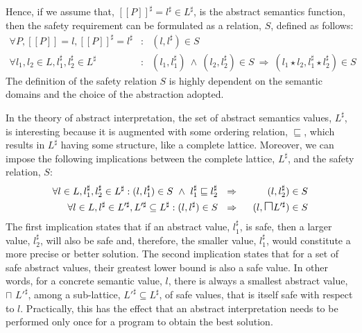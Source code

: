 \documentclass[10pt,a4paper,final,oneside,fleqn]{book}
\begin{document}
Hence, if we assume that, $[\![P]\!]^\sharp=l^\sharp\in L^\sharp$, is the abstract semantics function, then the safety requirement can be formulated as a relation, $S$, defined as follows:
\begin{eqnarray*}
\forall P, [\![P]\!]=l, [\![P]\!]^\sharp=l^\sharp&:&(l,l^\sharp)\in S\\
\forall l_1,l_2\in L,l_1^\sharp,l_2^\sharp\in L^\sharp&:&(l_1,l_1^\sharp)~\wedge~(l_2,l_2^\sharp)\in S~\Rightarrow~(l_1\star l_2, l_1^\sharp\star l_2^\sharp)\in S
\end{eqnarray*}
The definition of the safety relation $S$ is highly dependent on the semantic domains and the choice of the abstraction adopted.

In the theory of abstract interpretation, the set of abstract semantics values, $L^\sharp$, is interesting because it is augmented with some ordering relation, $\sqsubseteq$, which results in $L^\sharp$ having some structure, like a complete lattice. Moreover, we can impose the following implications between the complete lattice, $L^\sharp$, and the safety relation, $S$:
\begin{eqnarray*}
\forall l\in L,l_1^\sharp,l_2^\sharp\in L^\sharp: (l,l_1^\sharp)\in S~\wedge~l_1^\sharp\sqsubseteq l_2^\sharp~~&\Rightarrow&~~(l,l_2^\sharp)\in S\\
\forall l\in L, l^\sharp\in L'^\sharp, L'^\sharp\subseteq L^\sharp: (l,l^\sharp)\in S~~&\Rightarrow&~~(l,\mbox{{\Large$\sqcap$}} L'^\sharp)\in S
\end{eqnarray*}
The first implication states that if an abstract value, $l_1^\sharp$, is safe, then a larger value, $l_2^\sharp$, will also be safe and, therefore, the smaller value, $l_1^\sharp$, would constitute a more precise or better solution. The second implication states that for a set of safe abstract values, their greatest lower bound is also a safe value. In other words, for a concrete semantic value, $l$, there is always a smallest abstract value, {\Large$\sqcap$} $L'^\sharp$, among a sub-lattice, $L'^\sharp\subseteq L^\sharp$, of safe values, that is itself safe with respect to $l$. Practically, this has the effect that an abstract interpretation needs to be performed only once for a program to obtain the best solution.
\end{document}
